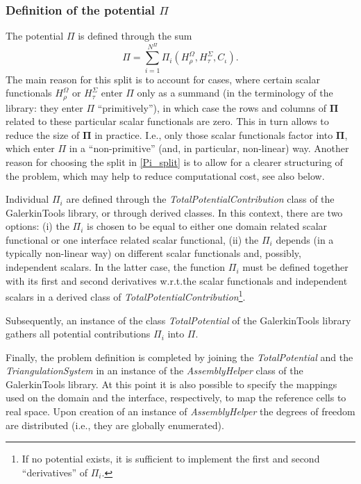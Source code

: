 \documentclass[pdftex,a4paper,12pt,abstracton]{scrartcl}
\begin{document}
\subsubsection{Definition of the potential $\Pi$}
The potential $\Pi$ is defined through the sum
\begin{equation}
\Pi = \sum^{N^\Pi}_{i=1} \Pi_i(H^\Omega_\rho, H^\Sigma_\tau, C_\iota).
\label{Pi_split}
\end{equation}
The main reason for this split is to account for cases, where certain scalar functionals $H^\Omega_\rho$ or $H^\Sigma_\tau$ enter $\Pi$ only as a summand (in the terminology of the library: they enter $\Pi$ ``primitively''), in which case the rows and columns of $\boldsymbol{\Pi}$ related to these particular scalar functionals are zero. This in turn allows to reduce the size of $\boldsymbol{\Pi}$ in practice. I.e., only those scalar functionals factor into $\boldsymbol{\Pi}$, which enter $\Pi$ in a ``non-primitive'' (and, in particular, non-linear) way. Another reason for choosing the split in \eqref{Pi_split} is to allow for a clearer structuring of the problem, which may help to reduce computational cost, see also below.

Individual $\Pi_i$ are defined through the \textit{TotalPotentialContribution} class of the GalerkinTools library, or through derived classes. In this context, there are two options: (i) the $\Pi_i$ is chosen to be equal to either one domain related scalar functional or one interface related scalar functional, (ii) the $\Pi_i$ depends (in a typically non-linear way) on different scalar functionals and, possibly, independent scalars. In the latter case, the function $\Pi_i$ must be defined together with its first and second derivatives w.r.t.\@ the scalar functionals and independent scalars in a derived class of \textit{TotalPotentialContribution}\footnote{If no potential exists, it is sufficient to implement the first and second ``derivatives'' of $\Pi_i$.}.

Subsequently, an instance of the class \textit{TotalPotential} of the GalerkinTools library gathers all potential contributions $\Pi_i$ into $\Pi$.

Finally, the problem definition is completed by joining the \textit{TotalPotential} and the \textit{TriangulationSystem} in an instance of the \textit{AssemblyHelper} class of the GalerkinTools library. At this point it is also possible to specify the mappings used on the domain and the interface, respectively, to map the reference cells to real space. Upon creation of an instance of \textit{AssemblyHelper} the degrees of freedom are distributed (i.e., they are globally enumerated).
\end{document}
